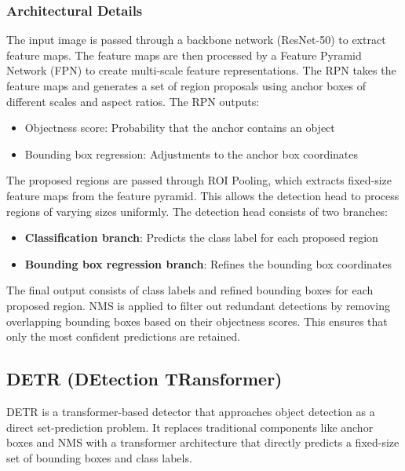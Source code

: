 \documentclass[12pt,a4paper]{article}
\begin{document}
\subsubsection{Architectural Details}
The input image is passed through a backbone network (ResNet-50) to extract feature maps.
The feature maps are then processed by a Feature Pyramid Network (FPN) to create multi-scale feature representations.
The RPN takes the feature maps and generates a set of region proposals using anchor boxes of different scales and aspect ratios.
The RPN outputs:
\begin{itemize}
    \item Objectness score: Probability that the anchor contains an object
    \item Bounding box regression: Adjustments to the anchor box coordinates
\end{itemize}
The proposed regions are passed through ROI Pooling, which extracts fixed-size feature maps from the feature pyramid.
This allows the detection head to process regions of varying sizes uniformly.
The detection head consists of two branches:
\begin{itemize}
    \item \textbf{Classification branch}: Predicts the class label for each proposed region
    \item \textbf{Bounding box regression branch}: Refines the bounding box coordinates
\end{itemize}
The final output consists of class labels and refined bounding boxes for each proposed region.
NMS is applied to filter out redundant detections by removing overlapping bounding boxes based on their objectness scores.
This ensures that only the most confident predictions are retained.


\subsection{DETR (DEtection TRansformer)}

DETR is a transformer-based detector that approaches object detection as a direct set-prediction problem.
It replaces traditional components like anchor boxes and NMS with a transformer architecture that directly predicts a fixed-size set of bounding boxes and class labels.
\end{document}
